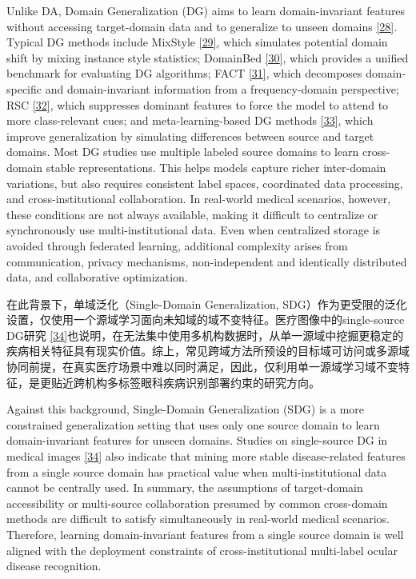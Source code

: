 Unlike DA, Domain Generalization (DG) aims to learn domain-invariant features without accessing target-domain data and to generalize to unseen domains \hyperref[_Ref213949554]{{[}28{]}}. Typical DG methods include MixStyle \hyperref[_Ref213949562]{{[}29{]}}, which simulates potential domain shift by mixing instance style statistics; DomainBed \hyperref[_Ref213949607]{{[}30{]}}, which provides a unified benchmark for evaluating DG algorithms; FACT \hyperref[_Ref213949788]{{[}31{]}}, which decomposes domain-specific and domain-invariant information from a frequency-domain perspective; RSC \hyperref[_Ref213949796]{{[}32{]}}, which suppresses dominant features to force the model to attend to more class-relevant cues; and meta-learning-based DG methods \hyperref[_Ref213949803]{{[}33{]}}, which improve generalization by simulating differences between source and target domains. Most DG studies use multiple labeled source domains to learn cross-domain stable representations. This helps models capture richer inter-domain variations, but also requires consistent label spaces, coordinated data processing, and cross-institutional collaboration. In real-world medical scenarios, however, these conditions are not always available, making it difficult to centralize or synchronously use multi-institutional data. Even when centralized storage is avoided through federated learning, additional complexity arises from communication, privacy mechanisms, non-independent and identically distributed data, and collaborative optimization.

在此背景下，单域泛化（Single-Domain Generalization, SDG）作为更受限的泛化设置，仅使用一个源域学习面向未知域的域不变特征。医疗图像中的single-source DG研究 \hyperref[_Ref213949863]{{[}34{]}}也说明，在无法集中使用多机构数据时，从单一源域中挖掘更稳定的疾病相关特征具有现实价值。综上，常见跨域方法所预设的目标域可访问或多源域协同前提，在真实医疗场景中难以同时满足，因此，仅利用单一源域学习域不变特征，是更贴近跨机构多标签眼科疾病识别部署约束的研究方向。

Against this background, Single-Domain Generalization (SDG) is a more constrained generalization setting that uses only one source domain to learn domain-invariant features for unseen domains. Studies on single-source DG in medical images \hyperref[_Ref213949863]{{[}34{]}} also indicate that mining more stable disease-related features from a single source domain has practical value when multi-institutional data cannot be centrally used. In summary, the assumptions of target-domain accessibility or multi-source collaboration presumed by common cross-domain methods are difficult to satisfy simultaneously in real-world medical scenarios. Therefore, learning domain-invariant features from a single source domain is well aligned with the deployment constraints of cross-institutional multi-label ocular disease recognition.

